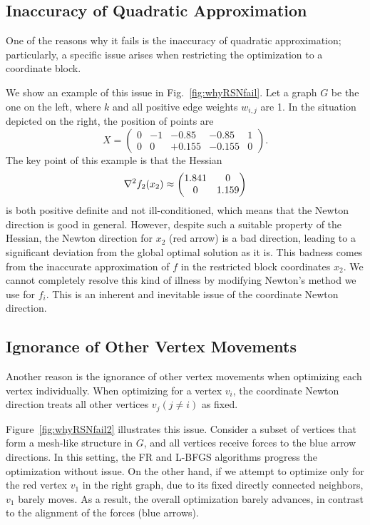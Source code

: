 \documentclass[dvipdfmx,10pt,journal,compsoc]{IEEEtran}
\begin{document}
\subsection{Inaccuracy of Quadratic Approximation}\label{ssec:inaccuracy}

One of the reasons why it fails is the inaccuracy of quadratic approximation; particularly, a specific issue arises when restricting the optimization to a coordinate block.

We show an example of this issue in Fig.~\ref{fig:whyRSNfail}.
Let a graph $G$ be the one on the left, where $k$ and all positive edge weights $w_{i,j}$ are 1.
In the situation depicted on the right, the position of points are
\begin{equation*}
  X = \begin{pmatrix}
    0 & -1 & -0.85  & -0.85  & 1 \\
    0 & 0  & +0.155 & -0.155 & 0
  \end{pmatrix}.
\end{equation*}
The key point of this example is that the Hessian
\begin{equation*}
  \nabla^2 f_2(x_2) \approx \mqty(1.841&0\\0&1.159)
\end{equation*}
is both positive definite and not ill-conditioned, which means that the Newton direction is good in general. However, despite such a suitable property of the Hessian, the Newton direction for $x_2$ (red arrow) is a bad direction, leading to a significant deviation from the global optimal solution as it is. This badness comes from the inaccurate approximation of $f$ in the restricted block coordinates $x_2$.
We cannot completely resolve this kind of illness by modifying Newton's method we use for $f_i$. This is an inherent and inevitable issue of the coordinate Newton direction.

\subsection{Ignorance of Other Vertex Movements}\label{ssec:ignorance}

Another reason is the ignorance of other vertex movements when optimizing each vertex individually.
When optimizing for a vertex $v_i$, the coordinate Newton direction treats all other vertices $v_j (j \neq i)$ as fixed.

Figure~\ref{fig:whyRSNfail2} illustrates this issue.
Consider a subset of vertices that form a mesh-like structure in $G$, and all vertices receive forces to the blue arrow directions.
In this setting, the FR and L-BFGS algorithms progress the optimization without issue.
On the other hand, if we attempt to optimize only for the red vertex $v_1$ in the right graph, due to its fixed directly connected neighbors, $v_1$ barely moves.
As a result, the overall optimization barely advances, in contrast to the alignment of the forces (blue arrows).
\end{document}
